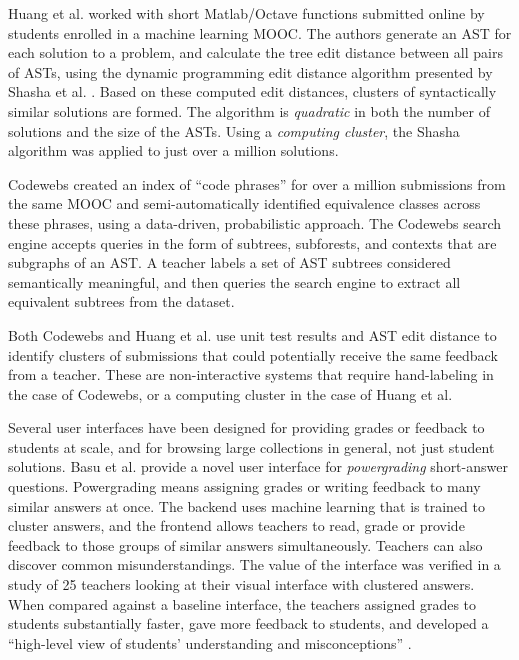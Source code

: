 \documentclass{sigchi}
\begin{document}
Huang et al. \citeyear{MOOCshop} worked with short Matlab/Octave functions submitted online by students enrolled in a machine learning MOOC. The authors generate an AST for each solution to a problem, and calculate the tree edit distance between all pairs of ASTs, using the dynamic programming edit distance algorithm presented by Shasha et al. \citeyear{shasha1994exact}. Based on these computed edit distances, clusters of syntactically similar solutions are formed. The algorithm is \emph{quadratic} in both the number of solutions and the size of the ASTs. Using a \emph{computing cluster}, the Shasha algorithm was applied to just over a million solutions. 

Codewebs \cite{codewebs} created an index of ``code phrases'' for over a million submissions from the same MOOC and semi-automatically identified equivalence classes across these phrases, using a data-driven, probabilistic approach. The Codewebs search engine accepts queries in the form of subtrees, subforests, and contexts that are subgraphs of an AST. A teacher labels a set of AST subtrees considered semantically meaningful, and then queries the search engine to extract all equivalent subtrees from the dataset. 

Both Codewebs \cite{codewebs} and Huang et al. \citeyear{MOOCshop} use unit test results and AST edit distance to identify clusters of submissions that could potentially receive the same feedback from a teacher. These are non-interactive systems that require hand-labeling in the case of Codewebs, or a computing cluster in the case of Huang et al. 

Several user interfaces have been designed for providing grades or feedback to students at scale, and for browsing large collections in general, not just student solutions. Basu et al. \citeyear{basupowergrading} provide a novel user interface for {\it powergrading} short-answer questions. Powergrading means assigning grades or writing feedback to many similar answers at once. The backend uses machine learning that is trained to cluster answers, and the frontend allows teachers to read, grade or provide feedback to those groups of similar answers simultaneously. Teachers can also discover common misunderstandings. The value of the interface was verified in a study of 25 teachers looking at their visual interface with clustered answers. When compared against a baseline interface, the teachers assigned grades to students substantially faster, gave more feedback to students, and developed a ``high-level view of students' understanding and misconceptions'' \cite{basuDivideAndConquer}.
\end{document}
